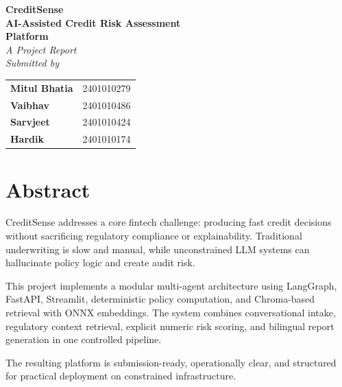 \documentclass[12pt,a4paper]{article}
\begin{document}
\begin{titlepage}
    \centering
    \vspace*{2.0cm}

    {\Huge \bfseries \color{primary} CreditSense}\\[1.1cm]
    {\LARGE \bfseries AI-Assisted Credit Risk Assessment\\Platform}\\[1.7cm]

    {\Large \textit{A Project Report}}\\[0.7cm]
    {\Large \textit{Submitted by}}\\[1.0cm]

    \renewcommand{\arraystretch}{1.35}
    \begin{tabular}{ll}
        \textbf{Mitul Bhatia} & 2401010279 \\
        \textbf{Vaibhav} & 2401010486 \\
        \textbf{Sarvjeet} & 2401010424 \\
        \textbf{Hardik} & 2401010174 \\
    \end{tabular}

    \vfill
\end{titlepage}

\tableofcontents
\newpage

\section*{Abstract}

CreditSense addresses a core fintech challenge: producing fast credit decisions without sacrificing regulatory compliance or explainability. Traditional underwriting is slow and manual, while unconstrained LLM systems can hallucinate policy logic and create audit risk.

This project implements a modular multi-agent architecture using LangGraph, FastAPI, Streamlit, deterministic policy computation, and Chroma-based retrieval with ONNX embeddings. The system combines conversational intake, regulatory context retrieval, explicit numeric risk scoring, and bilingual report generation in one controlled pipeline.

The resulting platform is submission-ready, operationally clear, and structured for practical deployment on constrained infrastructure.
\end{document}
